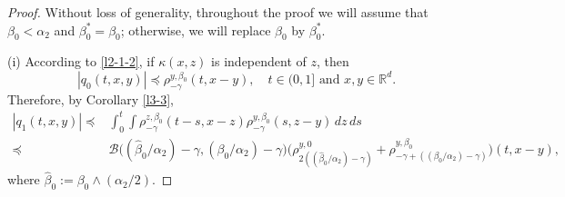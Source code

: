 \documentclass[a4paper,11pt]{amsart}
\newcommand{\R}{\mathds R}
\newcommand{\B}{\beta}
\newcommand{\p}{\preceq}
\newcommand{\A}{\alpha}
\newcommand{\Bb}{\mathscr{B}}
\def\wh{\widehat}
\theoremstyle{definition}
\begin{document}
\begin{proof}
Without loss of generality, throughout the proof we will assume that $\B_0< \A_2$ and $\B_0^*=\B_0$; otherwise, we will replace $\B_0$ by $\B_0^*.$


(i) According to \eqref{l2-1-2}, if $\kappa(x,z)$ is independent of $z$, then
$$|q_0(t,x,y)|\p \rho_{-\gamma}^{y,\beta_0}(t,x-y),\quad t\in(0,1] \textrm{ and } x,y \in \R^d.$$
Therefore, by Corollary \ref{l3-3},
\begin{align*}|q_1(t,x,y)|\p&\int_0^t\int \rho_{-\gamma}^{z,\B_0}(t-s,x-z) \rho^{y,\B_0}_{-\gamma}(s,z-y)\,dz\,ds\\
\p& \Bb\big(({\wh\B_0}/{\A_2})-\gamma, ({\B_0}/{\A_2})-\gamma\big)
\big(\rho_{2(({\wh
\B_0}/{\A_2})-\gamma)}^{y,0}+\rho_{-\gamma+(({\B_0}/{\A_2})-\gamma)}^{y,\B_0}\big)(t,x-y),\end{align*}
where $\wh \B_0:=\B_0 \wedge (\A_2/2)$.



\end{proof}
\end{document}

